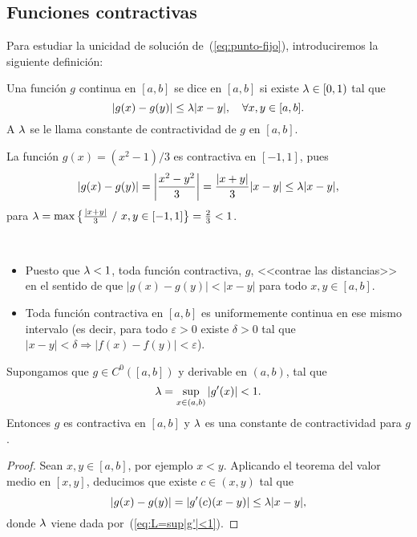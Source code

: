 \subsection*{Funciones contractivas}

Para estudiar la unicidad de solución de~(\ref{eq:punto-fijo}),
introduciremos la siguiente definición:

\begin{definition}
  Una función $g$ continua en $[a,b]$ se dice  en
  $[a,b]$ si existe $\lambda\in[0,1)$ tal que
  \begin{equation*}
    |g(x)-g(y)| \le \lambda |x-y|, \quad \forall x,y \in [a,b].
    \label{eq:contractividad}
  \end{equation*}
  A $\lambda$ se le llama constante de contractividad de $g$ en $[a,b]$.
  \label{def:funcion.contractiva}
\end{definition}

\begin{example}
  La función $g(x)=(x^2-1)/3$ es contractiva en $[-1,1]$, pues
  $$
  |g(x)-g(y)|=\left|\frac{x^2-y^2}{3}\right| = \frac{|x+y|}{3}|x-y| \le
  \lambda |x-y|,
  $$
  para $\lambda=\max \big\{ \frac{|x+y|}{3}\ /\ x,y\in [-1,1]
  \big\} =\frac23 <1$.
\end{example}

\begin{remark}~
  \begin{itemize}
  \item Puesto que $\lambda<1$, toda función contractiva, $g$, <<contrae las
    distancias>> en el sentido de que $|g(x)-g(y)|<|x-y|$ para todo
    $x,y\in [a,b]$.
  \item Toda función contractiva en $[a,b]$ es
    uniformemente continua en ese mismo intervalo (es decir, para
    todo $\varepsilon>0$ existe $\delta>0$ tal que $|x-y|<\delta
    \Rightarrow |f(x)-f(y)|<\varepsilon$).
  \end{itemize}
\end{remark}

\begin{proposition}
  \label{pro:1}
  Supongamos que $g\in C^0([a,b])$ y derivable en $(a,b)$, tal que
  \begin{equation}
    \lambda=\sup_{x\in(a,b)} |g'(x)|<1.
    \label{eq:L=sup|g'|<1}
  \end{equation}
  Entonces $g$ es contractiva en $[a,b]$ y $\lambda$ es una
  constante de contractividad para $g$.
\end{proposition}
\begin{proof}
  Sean $x,y\in [a,b]$, por ejemplo $x<y$. Aplicando el teorema del
  valor medio en $[x,y]$, deducimos que existe $c\in (x,y)$ tal que
  \begin{equation*}
    |g(x)-g(y)|=|g'(c)(x-y)| \le \lambda |x-y|,
  \end{equation*}
  donde $\lambda$ viene dada por~(\ref{eq:L=sup|g'|<1}).
\end{proof}

